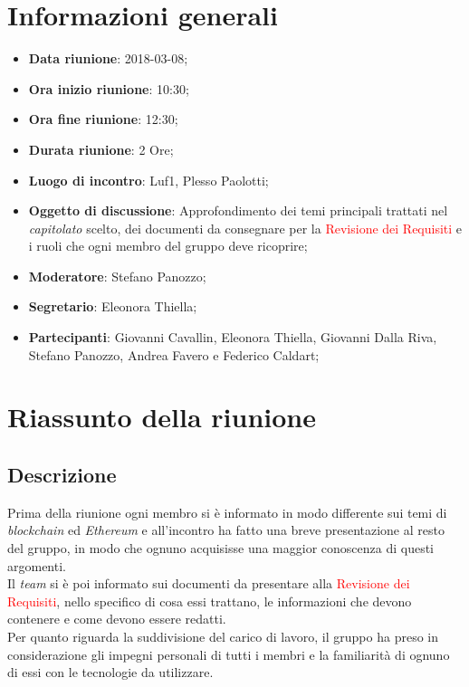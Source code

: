\section{Informazioni generali}
	\begin{itemize}
		\item \textbf{Data riunione}: 2018-03-08;
		\item \textbf{Ora inizio riunione}: 10:30;
		\item \textbf{Ora fine riunione}: 12:30;
		\item \textbf{Durata riunione}: 2 Ore;
		\item \textbf{Luogo di incontro}: Luf1, Plesso Paolotti;
		\item \textbf{Oggetto di discussione}: Approfondimento dei temi principali trattati nel \emph{capitolato} scelto, dei documenti da consegnare per la \textcolor{red}{Revisione dei Requisiti} e i ruoli che ogni membro del gruppo deve ricoprire;
		\item \textbf{Moderatore}: Stefano Panozzo;
		\item \textbf{Segretario}: Eleonora Thiella;
		\item \textbf{Partecipanti}: Giovanni Cavallin, Eleonora Thiella, Giovanni Dalla Riva, Stefano Panozzo, Andrea Favero e Federico Caldart;
	\end{itemize}

\section{Riassunto della riunione}
	\subsection{Descrizione}
	Prima della riunione ogni membro si è informato in modo differente sui temi di \emph{blockchain} ed \emph{Ethereum} e all'incontro ha fatto una breve presentazione al resto del gruppo, in modo che ognuno acquisisse una maggior conoscenza di questi argomenti.
	\\Il \emph{team} si è poi informato sui documenti da presentare alla \textcolor{red}{Revisione dei Requisiti}, nello specifico di cosa essi trattano, le informazioni che devono contenere e come devono essere redatti.
	\\Per quanto riguarda la suddivisione del carico di lavoro, il gruppo ha preso in considerazione gli impegni personali di tutti i membri e la familiarità di ognuno di essi con le tecnologie da utilizzare.
